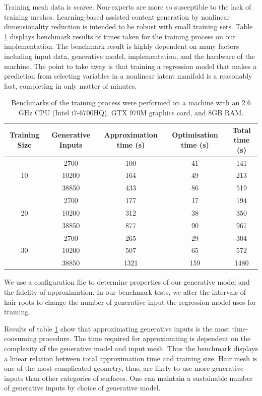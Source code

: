 \documentclass[ %
author={Dillon Keith Diep},
supervisor={Dr. Carl Henrik Ek},
degree={MEng},
title={ART-CG Hair:},
subtitle={Assisted Real-time Content Generation of Stylised Virtual Hair},
type={Research},
year={2017} ]{dissertation}
\begin{document}
Training mesh data is scarce. Non-experts are more so susceptible to the lack of training meshes. Learning-based assisted content generation by nonlinear dimensionality reduction is intended to be robust with small training sets. Table \ref{trainingbenchmarks} displays benchmark results of times taken for the training process on our implementation. The benchmark result is highly dependent on many factors including input data, generative model, implementation, and the hardware of the machine. The point to take away is that training a regression model that makes a prediction from selecting variables in a nonlinear latent manifold is a reasonably fast, completing in only matter of minutes.

\begin{table}[!h]
	\centering
	\begin{tabular}{|c|c|c|c|c|}
		\hline
		Training Size & Generative Inputs & Approximation time (s)  & Optimisation time (s) &   Total time (s)\\
		\hline
		\multirow{3}{*}{10}
		& 2700  & 100       & 41        & 141\\
		& 10200 & 164       & 49        & 213\\
		& 38850 & 433       & 86        & 519\\
		\hline
		\multirow{3}{*}{20}
		& 2700  & 177       & 17        & 194\\
		& 10200 & 312       & 38        & 350\\
		& 38850 & 877       & 90        & 967\\
		\hline
		\multirow{3}{*}{30}
		& 2700  & 265       & 29        & 304\\
		& 10200 & 507       & 65        & 572\\
		& 38850 & 1321      & 159       & 1480\\
		\hline
	\end{tabular}
	\caption{Benchmarks of the training process were performed on a machine with an 2.6 GHz CPU (Intel i7-6700HQ), GTX 970M graphics card, and 8GB RAM. }
	\label{trainingbenchmarks}
\end{table}

We use a configuration file to determine properties of our generative model and the fidelity of approximation. In our benchmark tests, we alter the intervals of hair roots to change the number of generative input the regression model uses for training.

Results of table \ref{trainingbenchmarks} show that approximating generative inputs is the most time-consuming procedure. The time required for approximating is dependent on the complexity of the generative model and input mesh. Thus the benchmark displays a linear relation between total approximation time and training size. Hair mesh is one of the most complicated geometry, thus, are likely to use more generative inputs than other categories of surfaces. One can maintain a sustainable number of generative inputs by choice of generative model.
\end{document}
